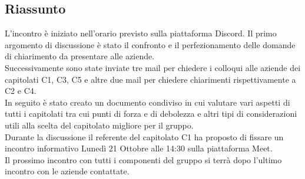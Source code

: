 \documentclass[10pt]{article}
\begin{document}
\subsection{Riassunto}
L'incontro è iniziato nell'orario previsto sulla piattaforma Discord. 
Il primo argomento di discussione è stato il confronto e il perfezionamento delle domande di chiarimento da presentare alle aziende.
\\Successivamente sono state inviate tre mail per chiedere i colloqui alle aziende dei capitolati C1, C3, C5 e altre due mail per chiedere chiarimenti rispettivamente a C2 e C4.
\\In seguito è stato creato un documento condiviso in cui valutare vari aspetti di tutti i capitolati tra cui punti di forza e di debolezza e altri tipi di considerazioni utili alla scelta del capitolato migliore per il gruppo.
\\Durante la discussione il referente del capitolato C1 ha proposto di fissare un incontro informativo Lunedì 21 Ottobre alle 14:30 sulla piattaforma Meet.
\\Il prossimo incontro con tutti i componenti del gruppo si terrà dopo l'ultimo incontro con le aziende contattate.
\end{document}
